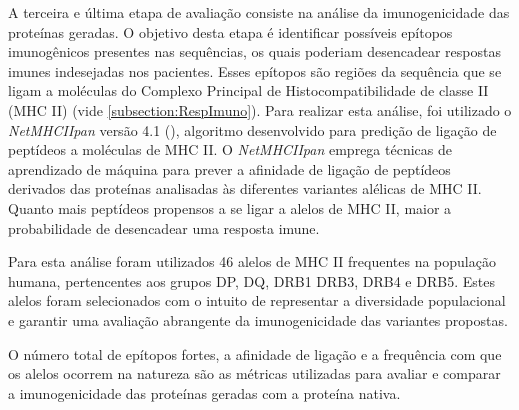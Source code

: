 A terceira e última etapa de avaliação consiste na análise da imunogenicidade das proteínas geradas.
O objetivo desta etapa é identificar possíveis epítopos imunogênicos presentes nas sequências, 
os quais poderiam desencadear respostas imunes indesejadas nos pacientes.
Esses epítopos são regiões da sequência que se ligam a moléculas do 
Complexo Principal de Histocompatibilidade de classe II (MHC II) (vide \ref{subsection:RespImuno}). 
Para realizar esta análise, foi utilizado o \textit{NetMHCIIpan} versão 4.1 (\cite{Jensen2018NetMHCIIpan}), 
algoritmo desenvolvido para predição de ligação de peptídeos a moléculas 
de MHC II. 
O \textit{NetMHCIIpan} emprega técnicas de aprendizado de máquina para prever a afinidade de ligação de peptídeos 
derivados das proteínas analisadas às diferentes variantes alélicas de MHC II. 
Quanto mais peptídeos propensos a se ligar a alelos de MHC II,
maior a probabilidade de desencadear uma resposta imune.

Para esta análise foram utilizados 46 alelos de MHC II frequentes na população humana, 
pertencentes aos grupos DP, DQ, DRB1 DRB3, DRB4 e DRB5.
Estes alelos foram selecionados com o intuito de representar a diversidade populacional 
e garantir uma avaliação abrangente da imunogenicidade das variantes propostas.

O número total de epítopos fortes, a afinidade de ligação
e a frequência com que os alelos ocorrem na natureza são as métricas utilizadas
para avaliar e comparar a imunogenicidade das proteínas geradas com a proteína nativa. 




















